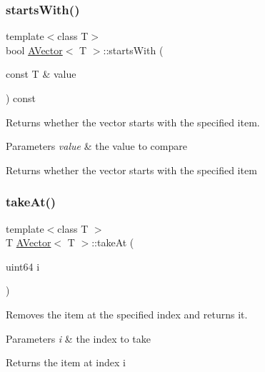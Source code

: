 \subsubsection{\texorpdfstring{startsWith()}{startsWith()}}
{\footnotesize\ttfamily template$<$class T$>$ \\
bool \mbox{\hyperlink{class_a_vector}{A\+Vector}}$<$ T $>$\+::starts\+With (\begin{DoxyParamCaption}\item[{const T \&}]{value }\end{DoxyParamCaption}) const}



Returns whether the vector starts with the specified item. 


\begin{DoxyParams}{Parameters}
{\em value} & the value to compare \\
\hline
\end{DoxyParams}
\begin{DoxyReturn}{Returns}
whether the vector starts with the specified item 
\end{DoxyReturn}
\mbox{\label{class_a_vector_a37df3ccd66a7747579aee01025e0e440}} 
\subsubsection{\texorpdfstring{takeAt()}{takeAt()}}
{\footnotesize\ttfamily template$<$class T $>$ \\
T \mbox{\hyperlink{class_a_vector}{A\+Vector}}$<$ T $>$\+::take\+At (\begin{DoxyParamCaption}\item[{uint64}]{i }\end{DoxyParamCaption})}



Removes the item at the specified index and returns it. 


\begin{DoxyParams}{Parameters}
{\em i} & the index to take \\
\hline
\end{DoxyParams}
\begin{DoxyReturn}{Returns}
the item at index i 
\end{DoxyReturn}
\mbox{\label{class_a_vector_ae2cad9bb2968e2fe2c96554f6b36c4a9}} 
